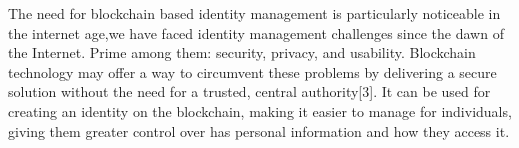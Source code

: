 The need for blockchain based identity management is particularly noticeable in the internet age,we have faced identity management challenges since the dawn of the Internet. Prime among them: security, privacy, and usability.
Blockchain technology may offer a way to circumvent these problems by delivering a secure solution without the need for a trusted, central authority[3]. It can be used for creating an identity on the blockchain, making it easier to manage for individuals, giving them greater control over has personal information and how they access it.


